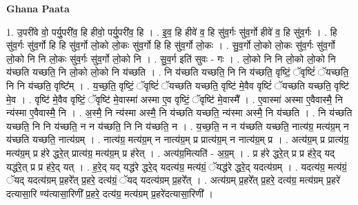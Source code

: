 \documentclass[17pt]{extarticle}
\begin{document}
\textbf{Ghana Paata } \newline

1. उ॒परी॑वे वो॒ पर्यु॒परी॑व॒ हि हीवो॒ पर्यु॒परी॑व॒ हि । . इ॒व॒ हि हीवे॑ व॒ हि सु॑व॒र्गः सु॑व॒र्गो हीवे॑ व॒ हि सु॑व॒र्गः । . हि सु॑व॒र्गः सु॑व॒र्गो हि हि सु॑व॒र्गो लो॒को लो॒कः सु॑व॒र्गो हि हि सु॑व॒र्गो लो॒कः । . सु॒व॒र्गो लो॒को लो॒कः सु॑व॒र्गः सु॑व॒र्गो लो॒को नि नि लो॒कः सु॑व॒र्गः सु॑व॒र्गो लो॒को नि । . सु॒व॒र्ग इति॑ सुवः - गः । . लो॒को नि नि लो॒को लो॒को नि य॑च्छति यच्छति॒ नि लो॒को लो॒को नि य॑च्छति । . नि य॑च्छति यच्छति॒ नि नि य॑च्छति॒ वृष्टिं॒ ॅवृष्टिं॑ ॅयच्छति॒ नि नि य॑च्छति॒ वृष्टि᳚म् । . य॒च्छ॒ति॒ वृष्टिं॒ ॅवृष्टिं॑ ॅयच्छति यच्छति॒ वृष्टि॑ मे॒वैव वृष्टिं॑ ॅयच्छति यच्छति॒ वृष्टि॑ मे॒व । . वृष्टि॑ मे॒वैव वृष्टिं॒ ॅवृष्टि॑ मे॒वास्मा॑ अस्मा ए॒व वृष्टिं॒ ॅवृष्टि॑ मे॒वास्मै᳚ । . ए॒वास्मा॑ अस्मा ए॒वैवास्मै॒ नि न्य॑स्मा ए॒वैवास्मै॒ नि । . अ॒स्मै॒ नि न्य॑स्मा अस्मै॒ नि य॑च्छति यच्छति॒ न्य॑स्मा अस्मै॒ नि य॑च्छति । . नि य॑च्छति यच्छति॒ नि नि य॑च्छति॒ न न य॑च्छति॒ नि नि य॑च्छति॒ न । . य॒च्छ॒ति॒ न न य॑च्छति यच्छति॒ नात्य॑ग्र॒ मत्य॑ग्र॒म् न य॑च्छति यच्छति॒ नात्य॑ग्रम् । . नात्य॑ग्र॒ मत्य॑ग्र॒म् न नात्य॑ग्र॒म् प्र प्रात्य॑ग्र॒म् न नात्य॑ग्र॒म् प्र । . अत्य॑ग्र॒म् प्र प्रात्य॑ग्र॒ मत्य॑ग्र॒म् प्र ह॑रे द्धरे॒त् प्रात्य॑ग्र॒ मत्य॑ग्र॒म् प्र ह॑रेत् । . अत्य॑ग्र॒मित्यति॑ - अ॒ग्र॒म् । . प्र ह॑रे द्धरे॒त् प्र प्र ह॑रे॒द् यद् यद्ध॑रे॒त् प्र प्र ह॑रे॒द् यत् । . ह॒रे॒द् यद् यद्ध॑रे द्धरे॒द् यदत्य॑ग्र॒ मत्य॑ग्रं॒ ॅयद्ध॑रे द्धरे॒द् यदत्य॑ग्रम् । . यदत्य॑ग्र॒ मत्य॑ग्रं॒ ॅयद् यदत्य॑ग्रम् प्र॒हरे᳚त् प्र॒हरे॒ दत्य॑ग्रं॒ ॅयद् यदत्य॑ग्रम् प्र॒हरे᳚त् । . अत्य॑ग्रम् प्र॒हरे᳚त् प्र॒हरे॒ दत्य॑ग्र॒ मत्य॑ग्रम् प्र॒हरे॑ दत्यासा॒रि ण्य॑त्यासा॒रिणी᳚ प्र॒हरे॒ दत्य॑ग्र॒ मत्य॑ग्रम् प्र॒हरे॑दत्यासा॒रिणी᳚ । \newline
\end{document}
